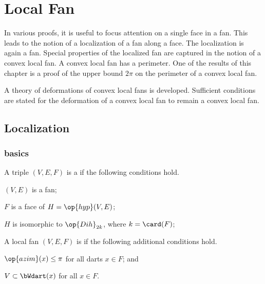 %
\chapter{Local Fan}\label{sec:local}


\begin{summary}
In various proofs, it is useful to focus attention on a single face
in a fan.  This leads to the notion of a localization of a fan along
a face.  The localization is again a fan.  Special properties of the
localized fan are captured in the notion of a convex local fan.  A convex local fan has a perimeter.  One of the results of this chapter is a proof
of the upper bound $2\pi$ on the perimeter of a convex local fan.

A theory of deformations of convex local fans is developed.  Sufficient
conditions are stated for the deformation of a convex local fan to remain
a convex local fan.
\end{summary}


\section{Localization}


\subsection{basics}


\begin{definition} 
A triple $(V,E,F)$ is a  if the following conditions hold.
\begin{description} 
\item {} $(V,E)$ is a fan;
\item {} $F$ is a face of $H = \op{hyp}(V,E)$;
\item {} $H$ is isomorphic to $\op{Dih}_{2k}$, where $k =
\card(F)$;
\end{description}
A local fan $(V,E,F)$ is  if the following additional conditions hold.
\begin{description}
\item {} $\op{azim}(x)\le \pi$ for all darts $x\in F$; and
\item {} $V\subset \bWdart(x)$ for all $x\in F$.
\end{description}
\end{definition}
%

